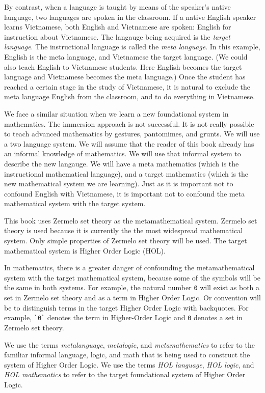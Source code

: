 By contrast, when a language is taught by means of the speaker's native language, two languages are spoken in the classroom.  If a native English speaker learns Vietnamese, both English and Vietnamese are spoken:  English for instruction about  Vietnamese.   The langauge being acquired is the {\it target language}.  The instructional language is called the {\it meta language}.  In this example, English is the meta language, and Vietnamese the target language.  (We could also teach English to Vietnamese students.  Here English becomes the target language and Vietnamese becomes the meta language.)  Once the student has reached a certain stage in the study of Vietnamese, it is natural to exclude the meta language English from the classroom, and to do everything in Vietnamese.

We face a similar situation when we learn a new foundational system in mathematics.  The immersion approach is not successful.  It is not really possible to teach advanced mathematics by gestures, pantomimes, and grunts.  We will use a two language system.  We will assume that the reader of this book already has an informal knowledge of mathematics.  We will use that informal system to describe the new langauge.  We will have a meta mathematics (which is the instructional mathematical language), and a target mathematics (which is the new mathematical system we are learning).  
Just as it is important not to confound English with Vietnamese, it is important not to confound the meta mathematical system with the target system.

This book uses Zermelo set theory as the metamathematical system.  Zermelo set theory is used because it is currently the the most widespread mathematical system.  Only simple properties of Zermelo set theory will be used.  The target mathematical system is Higher Order Logic (HOL).  

In mathematics, there is a greater danger of confounding the metamathematical system with the target mathematical system, because some of the symbols will be the same in both systems.  For example, the natural number \verb!0! will exist as both a set in Zermelo set theory and as a term in Higher Order Logic.   Or convention will be to distinguish terms in the target Higher Order Logic with backquotes.  For example, \verb!`0`! denotes the term in Higher-Order Logic and \verb!0! denotes a set in Zermelo set theory.

We use the terms {\it metalanguage}, {\it metalogic}, and {\it metamathematics} to refer to the familiar informal language, logic, and math that is being used to construct the system of Higher Order Logic.  We use the terms {\it HOL language}, {\it HOL logic}, and {\it HOL mathematics} to refer to the target foundational system of Higher Order Logic. 


